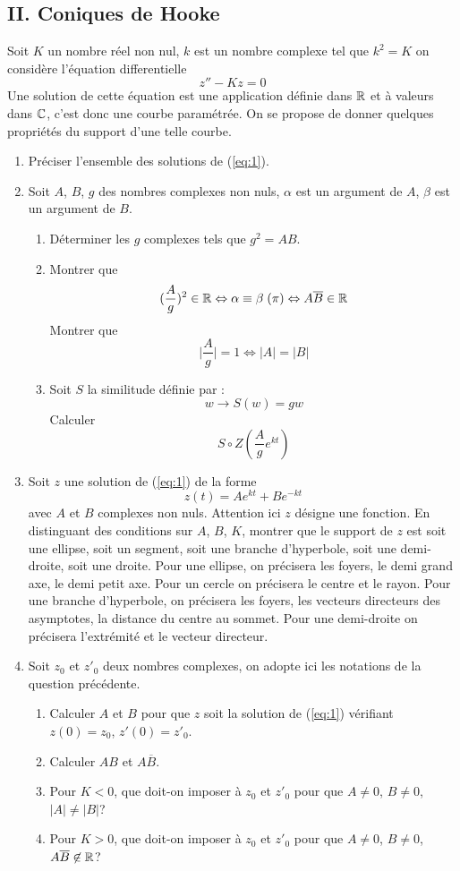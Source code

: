 \subsection*{II. Coniques de Hooke}
Soit $K$ un nombre réel non nul, $k$ est un nombre complexe tel que $k^2=K$ on considère l'équation differentielle
\begin{equation}
z''-Kz=0 \label{eq:1}
\end{equation}
Une solution de cette équation est une application définie dans $\mathbb{R}$ et à valeurs dans $\mathbb{C}$, c'est donc une courbe paramétrée. On se propose de donner quelques propriétés du support d'une telle courbe.
\begin{enumerate}
\item Préciser l'ensemble des solutions de (\ref{eq:1}).
\item Soit $A$, $B$, $g$ des nombres complexes non nuls, $\alpha$ est un argument de $A$, $\beta$ est un argument de $B$.
\begin{enumerate}
\item Déterminer les $g$ complexes tels que $g^2=AB$.
\item Montrer que 
\[(\frac{A}{g})^2\in \mathbb{R} \Leftrightarrow \alpha \equiv \beta \; (\pi) \Leftrightarrow A\overline{B}\in \mathbb{R}\]
Montrer que 
\[\vert\frac{A}{g}\vert=1\Leftrightarrow |A|=|B|\]
\item  Soit $S$ la similitude définie par :
\[w \rightarrow S(w)=gw\]
Calculer
\[S\circ Z(\frac{A}{g}e^{kt}) \]
\end{enumerate}
\item Soit $z$ une solution de (\ref{eq:1}) de la forme
\[z(t)=Ae^{kt}+Be^{-kt}\]
avec $A$ et $B$ complexes non nuls. Attention ici $z$ désigne une fonction.\newline
En distinguant des conditions sur $A$, $B$, $K$, montrer que le support de $z$ est soit une ellipse, soit un segment, soit une branche d'hyperbole, soit une demi-droite, soit une droite.
Pour une ellipse, on précisera les foyers, le demi grand axe, le demi petit axe.\newline
Pour un cercle on précisera le centre et le rayon.\newline
Pour une branche d'hyperbole, on précisera les foyers, les vecteurs directeurs des asymptotes, la distance du centre au sommet.\newline
Pour une demi-droite on précisera l'extrémité et le vecteur directeur.
\item Soit $z_0$ et $z'_0$ deux nombres complexes, on adopte ici les notations de la question précédente.
\begin{enumerate}
\item Calculer $A$ et $B$ pour que $z$ soit la solution de (\ref{eq:1}) vérifiant $z(0)=z_0$, $z'(0)=z'_0$.
\item Calculer $AB$ et $A\overline{B}$.
\item Pour $K<0$, que doit-on imposer à $z_0$ et $z'_0$ pour que $A\neq 0$, $B\neq 0$, $|A|\neq |B|$? 
\item Pour $K>0$, que doit-on imposer à $z_0$ et $z'_0$ pour que $A\neq 0$, $B\neq 0$, $A\overline{B}\not\in\mathbb{R}$?
\end{enumerate}
  
\end{enumerate}
